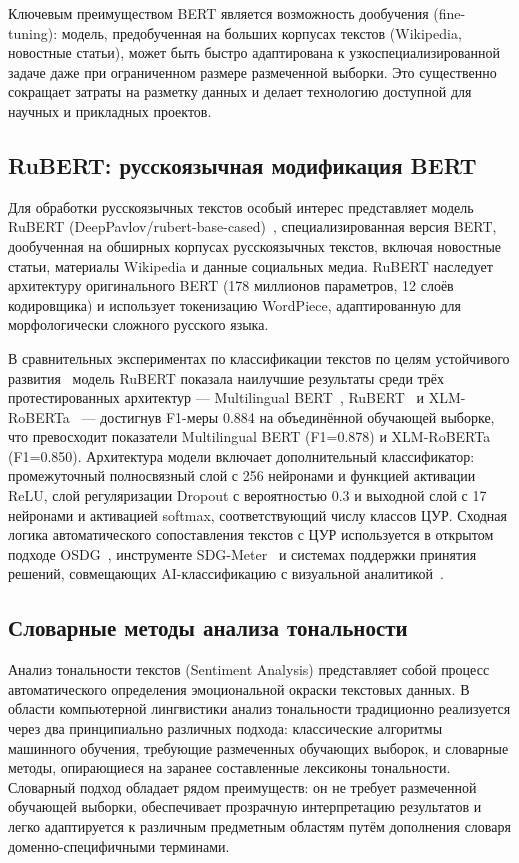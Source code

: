 \documentclass[master, och, coursework]{SCWorks1}
\begin{document}
Ключевым преимуществом BERT является возможность дообучения (fine-tuning): модель, предобученная на больших корпусах текстов (Wikipedia, новостные статьи), может быть быстро адаптирована к узкоспециализированной задаче даже при ограниченном размере размеченной выборки. Это существенно сокращает затраты на разметку данных и делает технологию доступной для научных и прикладных проектов.

\subsection{RuBERT: русскоязычная модификация BERT}
	
Для обработки русскоязычных текстов особый интерес представляет модель RuBERT (DeepPavlov/rubert-base-cased)~\cite{Kuratov2019}, специализированная версия BERT, дообученная на обширных корпусах русскоязычных текстов, включая новостные статьи, материалы Wikipedia и данные социальных медиа. RuBERT наследует архитектуру оригинального BERT (178 миллионов параметров, 12 слоёв кодировщика) и использует токенизацию WordPiece, адаптированную для морфологически сложного русского языка.

В сравнительных экспериментах по классификации текстов по целям устойчивого развития~\cite{Morozov2025} модель RuBERT показала наилучшие результаты среди трёх протестированных архитектур --- Multilingual BERT~\cite{Devlin2019}, RuBERT~\cite{Kuratov2019} и XLM-RoBERTa~\cite{Conneau2020} --- достигнув F1-меры 0.884 на объединённой обучающей выборке, что превосходит показатели Multilingual BERT (F1=0.878) и XLM-RoBERTa (F1=0.850). Архитектура модели включает дополнительный классификатор: промежуточный полносвязный слой с 256 нейронами и функцией активации ReLU, слой регуляризации Dropout с вероятностью 0.3 и выходной слой с 17 нейронами и активацией softmax, соответствующий числу классов ЦУР. Сходная логика автоматического сопоставления текстов с ЦУР используется в открытом подходе OSDG~\cite{Pukelis2020}, инструменте SDG-Meter~\cite{Guisiano2022} и системах поддержки принятия решений, совмещающих AI-классификацию с визуальной аналитикой~\cite{Barros2024}.

	\subsection{Словарные методы анализа тональности}
	
Анализ тональности текстов (Sentiment Analysis) представляет собой процесс автоматического определения эмоциональной окраски текстовых данных. В области компьютерной лингвистики анализ тональности традиционно реализуется через два принципиально различных подхода: классические алгоритмы машинного обучения, требующие размеченных обучающих выборок, и словарные методы, опирающиеся на заранее составленные лексиконы тональности. Словарный подход обладает рядом преимуществ: он не требует размеченной обучающей выборки, обеспечивает прозрачную интерпретацию результатов и легко адаптируется к различным предметным областям путём дополнения словаря доменно-специфичными терминами.
\end{document}
